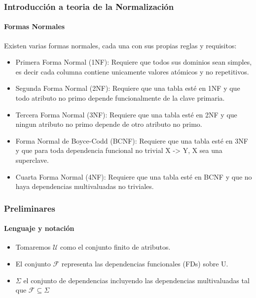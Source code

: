 \documentclass[aspectratio=169,12pt]{beamer}
\begin{document}
\begin{frame}
    \frametitle{Introducción a teoria de la Normalización}
    \framesubtitle{Formas Normales}
    Existen varias formas normales, cada una con sus propias reglas y requisitos: \\
    \begin{itemize}
        \item Primera Forma Normal (1NF): Requiere que todos sus dominios sean simples, es decir cada columna contiene unicamente valores atómicos y no repetitivos.
        \item Segunda Forma Normal (2NF): Requiere que una tabla esté en 1NF y que todo atributo no primo depende funcionalmente de la clave primaria.
        \item Tercera Forma Normal (3NF): Requiere que una tabla esté en 2NF y que ningun atributo no primo depende de otro atributo no primo.
        \item Forma Normal de Boyce-Codd (BCNF): Requiere que una tabla esté en 3NF y que para toda dependencia funcional no trivial X -> Y, X sea una superclave.
        \item Cuarta Forma Normal (4NF): Requiere que una tabla esté en BCNF y que no haya dependencias multivaluadas no triviales.
    \end{itemize}
\end{frame}

\begin{frame}
    \frametitle{Preliminares}
    \framesubtitle{Lenguaje y notación}
    \begin{itemize}
        \item Tomaremos $\mathcal{U}$ como el conjunto finito de atributos.
        \item El conjunto $\mathcal{F}$ representa las dependencias funcionales (FDs) sobre U.
        \item $\Sigma$ el conjunto de dependencias incluyendo las dependencias multivaluadas tal que $\mathcal{F} \subseteq \Sigma$
    \end{itemize}
\end{frame}
\end{document}
